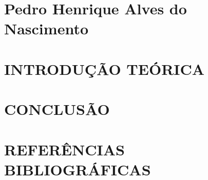 \documentclass[12pt]{article}
\begin{document}
    
    
    \listoftables
    \thispagestyle{empty}
    \newpage

    \listoffigures
    \thispagestyle{empty}
    \newpage

    \tableofcontents
    \thispagestyle{empty}
    \newpage

    \section*{Pedro Henrique Alves do Nascimento}
    \section{INTRODUÇÃO TEÓRICA}
    
    \section{CONCLUSÃO}

    \newpage
    \section*{\hfill REFERÊNCIAS BIBLIOGRÁFICAS\hfill}
    \printbibliography[heading=none]
\end{document}
